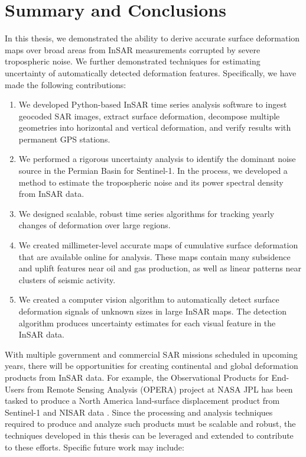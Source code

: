 
\chapter{Summary and Conclusions}
\label{CHAP:7}

In this thesis, we demonstrated the ability to derive accurate surface deformation maps over broad areas from InSAR measurements corrupted by severe tropospheric noise. We further demonstrated techniques for estimating uncertainty of automatically detected deformation features. Specifically, we have made the following contributions:


\begin{enumerate}
	
	\item We developed Python-based InSAR time series analysis software to ingest geocoded SAR images, extract surface deformation, decompose multiple geometries into horizontal and vertical deformation, and verify results with permanent GPS stations.
	
	\item We performed a rigorous uncertainty analysis to identify the dominant noise source in the Permian Basin for Sentinel-1.  In the process, we developed a method to estimate the tropospheric noise and its power spectral density from InSAR data.
	
	\item We designed scalable, robust time series algorithms for tracking yearly changes of deformation over large regions.
	
	\item We created millimeter-level accurate maps of cumulative surface deformation that are available online for analysis. These maps contain many subsidence and uplift features near oil and gas production, as well as linear patterns near clusters of seismic activity.
	
	\item We created a computer vision algorithm to automatically detect surface deformation signals of unknown sizes in large InSAR maps. The detection algorithm produces uncertainty estimates for each visual feature in the InSAR data.
	
		
\end{enumerate}

With multiple government and commercial SAR missions scheduled in upcoming years, there will be opportunities for creating continental and global deformation products from InSAR data.
For example, the Observational Products for End-Users from Remote Sensing Analysis (OPERA) project at NASA JPL has been tasked to produce a North America land-surface displacement product from Sentinel-1 and NISAR data
\citep{Bekaert2021IntroducingOperaProject}.
Since the processing and analysis techniques required to produce and analyze such products must be scalable and robust, the techniques developed in this thesis can be leveraged and extended to contribute to these efforts.
Specific future work may include:

